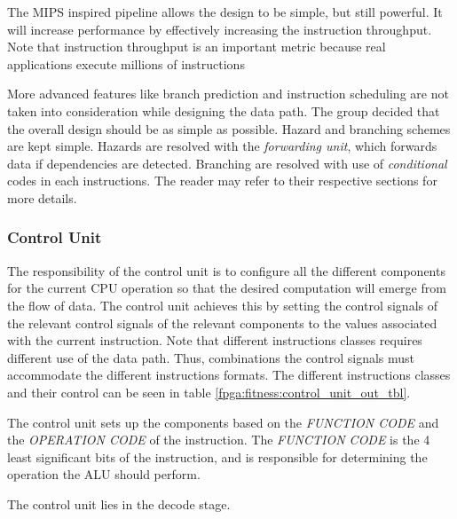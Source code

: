 The MIPS inspired pipeline allows the design to be simple, but still powerful.
It  will increase performance by effectively increasing the instruction throughput.
Note that instruction throughput is an important metric because real applications execute millions of instructions \cite[p.~335]{compOrgDes}



More advanced features like branch prediction and instruction scheduling are not taken into consideration while designing the data path.
The group decided that the overall design should be as simple as possible.
Hazard and branching schemes are kept simple.
Hazards are resolved with the \emph{forwarding unit}, which forwards data if dependencies are detected.
Branching are resolved with use of \emph{conditional} codes in each instructions.
The reader may refer to their respective sections for more details.



\subsubsection{Control Unit} 

The responsibility of the control unit is to configure all the different components for the current CPU operation so that the desired computation will emerge from the flow of data.
The control unit achieves this by setting the control signals of the relevant control signals of the relevant components to the values associated with the current instruction.
Note that different instructions classes requires different use of the data path.
Thus, combinations the control signals must accommodate the different instructions formats. The different instructions classes and their control can be seen in table \ref{fpga:fitness:control_unit_out_tbl}. 

The control unit sets up the components based on the \emph{FUNCTION CODE} and the \emph{OPERATION CODE} of the instruction. The \emph{FUNCTION CODE} is the 4 least significant bits of the instruction, and is responsible for determining the operation the ALU should perform. 

The control unit lies in the decode stage.
 

 









